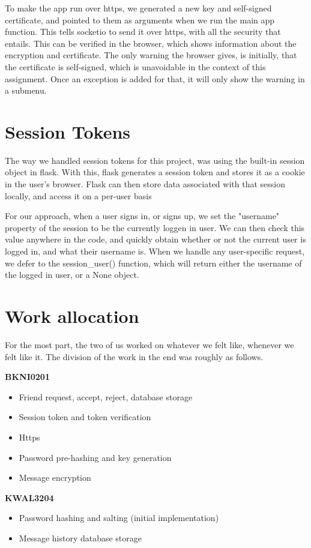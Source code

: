 \documentclass[12pt]{article}
\begin{document}
To make the app run over https, we generated a new key and self-signed certificate, and pointed to them as arguments when we run the main app function. This tells socketio to send it over https, with all the security that entails. This can be verified in the browser, which shows information about the encryption and certificate. The only warning the browser gives, is initially, that the certificate is self-signed, which is unavoidable in the context of this assignment. Once an exception is added for that, it will only show the warning in a submenu.

\section{Session Tokens}

The way we handled session tokens for this project, was using the built-in session object in flask. With this, flask generates a session token and stores it as a cookie in the user's browser. Flask can then store data associated with that session locally, and access it on a per-user basis

For our approach, when a user signs in, or signs up, we set the "username" property of the session to be the currently loggen in user. We can then check this value anywhere in the code, and quickly obtain whether or not the current user is logged in, and what their username is. When we handle any user-specific request, we defer to the session\_user() function, which will return either the username of the logged in user, or a None object.

\section{Work allocation}

For the most part, the two of us worked on whatever we felt like, whenever we felt like it. The division of the work in the end was roughly as follows.
\newline

\noindent \textbf{BKNI0201}

\begin{itemize}
\item Friend request, accept, reject, database storage
\item Session token and token verification
\item Https
\item Password pre-hashing and key generation
\item Message encryption
\end{itemize}

\noindent \textbf{KWAL3204}

\begin{itemize}
\item Password hashing and salting (initial implementation)
\item Message history database storage
\end{itemize}
\end{document}
